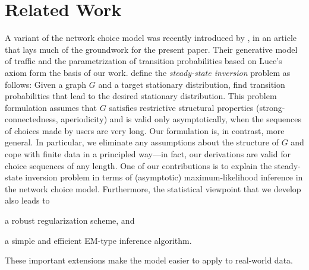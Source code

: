 \section{Related Work}  %
\label{cr:sec:relwork}

A variant of the network choice model was recently introduced by \citet{kumar2015inverting}, in an article that lays much of the groundwork for the present paper.
Their generative model of traffic and the parametrization of transition probabilities based on Luce's axiom form the basis of our work.
\citeauthor{kumar2015inverting} define the \emph{steady-state inversion} problem as follows:
Given a graph $G$ and a target stationary distribution, find transition probabilities that lead to the desired stationary distribution.
This problem formulation assumes that $G$ satisfies restrictive structural properties (strong-connectedness, aperiodicity) and is valid only asymptotically, when the sequences of choices made by users are very long.
Our formulation is, in contrast, more general.
In particular, we eliminate any assumptions about the structure of $G$ and cope with finite data in a principled way---in fact, our derivations are valid for choice sequences of any length.
One of our contributions is to explain the steady-state inversion problem in terms of (asymptotic) maximum-likelihood inference in the network choice model.
Furthermore, the statistical viewpoint that we develop also leads to
\begin{enuminline}
\item a robust regularization scheme, and
\item a simple and efficient EM-type inference algorithm.
\end{enuminline}
These important extensions make the model easier to apply to real-world data.

